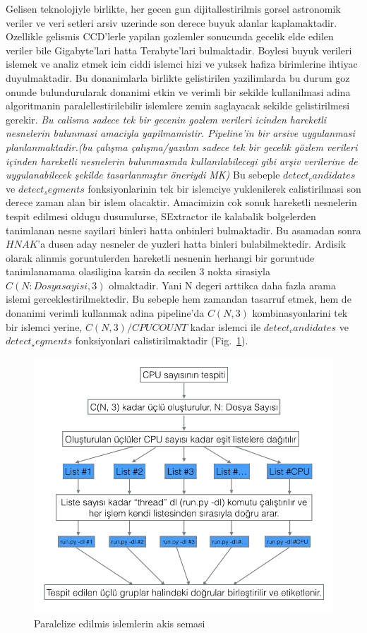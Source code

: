 \documentclass[review]{elsarticle}
\begin{document}
Gelisen teknolojiyle birlikte, her gecen gun dijitallestirilmis gorsel astronomik veriler ve veri setleri arsiv uzerinde son derece buyuk alanlar kaplamaktadir. Ozellikle gelismis CCD'lerle yapilan gozlemler sonucunda gecelik elde edilen veriler bile Gigabyte'lari hatta Terabyte'lari bulmaktadir. Boylesi buyuk verileri islemek ve analiz etmek icin ciddi islemci hizi ve yuksek hafiza birimlerine ihtiyac duyulmaktadir. Bu donanimlarla birlikte gelistirilen yazilimlarda bu durum goz onunde bulundurularak donanimi etkin ve verimli bir sekilde kullanilmasi adina algoritmanin paralellestirilebilir islemlere zemin saglayacak sekilde gelistirilmesi gerekir. {\em Bu calisma sadece tek bir gecenin gozlem verileri icinden hareketli nesnelerin bulunmasi amaciyla yapilmamistir. Pipeline'in bir arsive uygulanmasi planlanmaktadir.(bu çalışma çalışma/yazılım sadece tek bir gecelik gözlem verileri içinden hareketli nesnelerin bulunmasında kullanılabilecegi gibi arşiv verilerine de uygulanabilecek şekilde tasarlanmıştır öneriydi MK)} Bu sebeple $detect_candidates$ ve $detect_segments$ fonksiyonlarinin tek bir islemciye yuklenilerek calistirilmasi son derece zaman alan bir islem olacaktir. Amacimizin cok sonuk hareketli nesnelerin tespit edilmesi oldugu dusunulurse, SExtractor ile kalabalik bolgelerden tanimlanan nesne sayilari binleri hatta onbinleri bulmaktadir. Bu asamadan sonra $HNAK$'a dusen aday nesneler de yuzleri hatta binleri bulabilmektedir. Ardisik olarak alinmis goruntulerden hareketli nesnenin herhangi bir goruntude tanimlanamama olasiligina karsin da secilen 3 nokta sirasiyla $C(N:Dosya sayisi, 3)$ olmaktadir. Yani N degeri arttikca daha fazla arama islemi gerceklestirilmektedir. Bu sebeple hem zamandan tasarruf etmek, hem de donanimi verimli kullanmak adina pipeline'da $C(N,3)$ kombinasyonlarini tek bir islemci yerine, $C(N,3)/CPUCOUNT$ kadar islemci ile $detect_candidates$ ve $detect_segments$ fonksiyonlari calistirilmaktadir (Fig.~\ref{fig:mp_akis_semasi}).

\begin{figure}[!t]
  \centering
  \includegraphics[scale=0.50]{mp_akis_semasi}
  \caption{Paralelize edilmis islemlerin akis semasi}
  \label{fig:mp_akis_semasi}
\end{figure}
\end{document}
